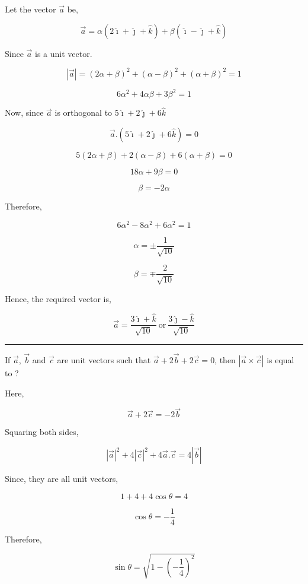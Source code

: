 \documentclass[twocolumn]{article}
\begin{document}
Let the vector \(\vec{a} \) be,

\[
    \vec{a}  = \alpha ( 2 \hat{\imath} + \hat{\jmath} + \hat{k}) + \beta (\hat{\imath}  - \hat{\jmath} + \hat{k} )
\]

Since \(\vec{a} \) is a unit vector.

\[
    |\vec{a} | = (2\alpha + \beta )^{2} + (\alpha -\beta)^{2} + (\alpha + \beta)^{2} = 1  
\]

\[
    6\alpha^2 + 4\alpha \beta + 3\beta^{2} = 1 \tag{1}
\]

Now, since \(\vec{a}\) is orthogonal to \(5 \hat{\imath} +2\hat{\jmath} + 6\hat{k} \)

\[
    \vec{a} . (5\hat{\imath}  + 2\hat{\jmath} + 6\hat{k} ) = 0
\]

\[
    5(2\alpha + \beta) + 2(\alpha -\beta ) + 6(\alpha + \beta ) = 0
\]

\[
    18\alpha + 9\beta = 0
\]

\[
    \beta = -2\alpha 
\]

Therefore, 

\[
    6\alpha ^2 - 8\alpha ^{2} + 6\alpha ^{2} = 1
\]

\[
    \alpha  = \pm \frac{1}{\sqrt{10} }
\]

\[
    \beta = \mp\frac{2}{\sqrt{10} }
\]

Hence, the required vector is,

\[\boxed{
    \vec{a} = \frac{3 \hat{\imath}  + \hat{k} }{\sqrt{10} }\ \text{or}\ \frac{3 \hat{\jmath}  - \hat{k} }{\sqrt{10} }}
\]

\hrule

\begin{question}
    If \(\vec{a}\), \(\vec{b} \) and \(\vec{c} \) are unit vectors such that \(\vec{a}  + 2 \vec{b} + 2\vec{c} = 0\), then \( |\vec{a} \times \vec{c}| \) is equal to ?  
\end{question}

Here, 

\[
    \vec{a} + 2\vec{c}  = -2\vec{b} 
\]

Squaring both sides,

\[
    |\vec{a}|^{2} + 4|\vec{c}|^{2} + 4\vec{a}.\vec{c} = 4|\vec{b} |
\]

Since, they are all unit vectors, 

\[
    1 + 4 + 4\cos \theta = 4
\]

\[
    \cos \theta = -\frac{1}{4}
\]

Therefore, 

\[
    \sin \theta = \sqrt{1 - (-\frac{1}{4})^{2} } 
\]
\end{document}
